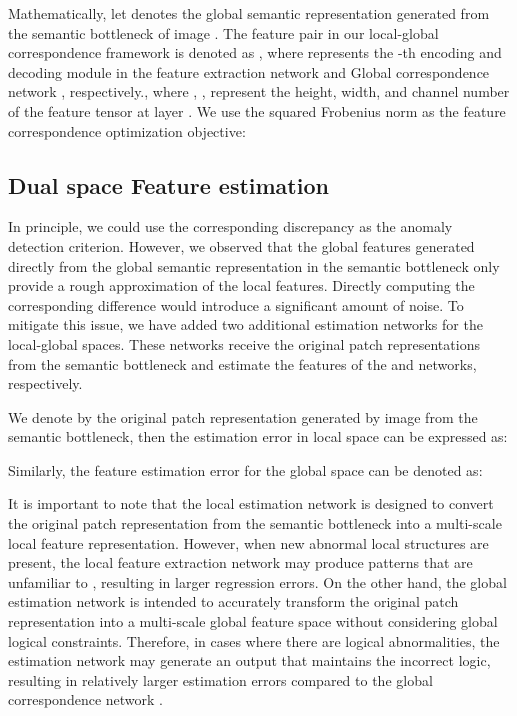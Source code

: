 \documentclass[lettersize,journal]{IEEEtran}
\begin{document}
Mathematically, let  denotes the global semantic representation generated from the semantic bottleneck of image . The feature pair in our local-global correspondence framework is denoted as , where  represents the -th encoding and decoding module in the feature extraction network  and Global correspondence network , respectively., where , ,  represent the height, width, and channel number of the feature tensor at layer . We use the squared Frobenius norm as the feature correspondence optimization objective:


\subsection{Dual space Feature estimation}

In principle, we could use the corresponding discrepancy as the anomaly detection criterion. However, we observed that the global features generated directly from the global semantic representation in the semantic bottleneck only provide a rough approximation of the local features. Directly computing the corresponding difference would introduce a significant amount of noise. To mitigate this issue, we have added two additional estimation networks for the local-global spaces. These networks receive the original patch representations from the semantic bottleneck and estimate the features of the  and  networks, respectively.


We denote by  the original patch representation generated by image  from the semantic bottleneck, then the estimation error in local space can be expressed as:


Similarly, the feature estimation error for the global space can be denoted as:



It is important to note that the local estimation network  is designed to convert the original patch representation  from the semantic bottleneck into a multi-scale local feature representation. However, when new abnormal local structures are present, the local feature extraction network  may produce patterns that are unfamiliar to , resulting in larger regression errors. On the other hand, the global estimation network  is intended to accurately transform the original patch representation  into a multi-scale global feature space without considering global logical constraints. Therefore, in cases where there are logical abnormalities, the estimation network  may generate an output that maintains the incorrect logic, resulting in relatively larger estimation errors compared to the global correspondence network .
\end{document}
